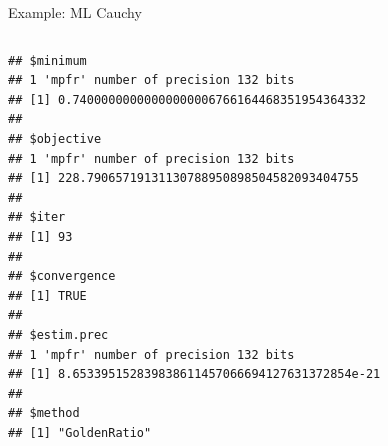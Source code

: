 \documentclass[11pt,compress,t,notes=noshow, xcolor=table]{beamer}
\begin{document}
\begin{vbframe}{Example: ML Cauchy}
\framebreak

\vspace*{-1cm}

\begin{columns}
\begin{column}{1\textwidth}
\begin{verbatim}
## $minimum
## 1 'mpfr' number of precision 132 bits
## [1] 0.74000000000000000006766164468351954364332
##
## $objective
## 1 'mpfr' number of precision 132 bits
## [1] 228.79065719131130788950898504582093404755
##
## $iter
## [1] 93
##
## $convergence
## [1] TRUE
##
## $estim.prec
## 1 'mpfr' number of precision 132 bits
## [1] 8.653395152839838611457066694127631372854e-21
##
## $method
## [1] "GoldenRatio"
\end{verbatim}

\end{column}
\end{columns}

\end{vbframe}
\endlecture
\end{document}
